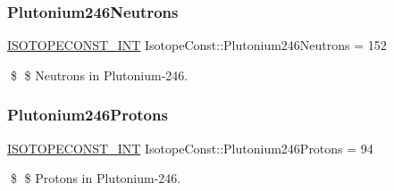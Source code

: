 \subsubsection{\texorpdfstring{Plutonium246\+Neutrons}{Plutonium246Neutrons}}
{\footnotesize\ttfamily \mbox{\hyperlink{group___isotope_const-_macros_ga5f18360b3e99483a35c32d789e62621c}{I\+S\+O\+T\+O\+P\+E\+C\+O\+N\+S\+T\+\_\+\+I\+NT}} Isotope\+Const\+::\+Plutonium246\+Neutrons = 152}

\$ \$ Neutrons in Plutonium-\/246. \mbox{\label{group___isotope_const-_plutonium-_pu246_ga86d38f0e5b4ee46819af7ac301ea8c5e}} 
\subsubsection{\texorpdfstring{Plutonium246\+Protons}{Plutonium246Protons}}
{\footnotesize\ttfamily \mbox{\hyperlink{group___isotope_const-_macros_ga5f18360b3e99483a35c32d789e62621c}{I\+S\+O\+T\+O\+P\+E\+C\+O\+N\+S\+T\+\_\+\+I\+NT}} Isotope\+Const\+::\+Plutonium246\+Protons = 94}

\$ \$ Protons in Plutonium-\/246. 